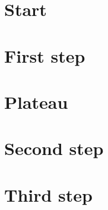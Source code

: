 \documentclass[10pt,a4paper]{article}
\begin{document}
\section{Start}\lipsum[1-7]
\section{First step}\limenthreshold\lipsum[8-16]
\section{Plateau}\lipsum[17-22]
\section{Second step}\limenthreshold\lipsum[23-31]
\section{Third step}\limenthreshold\lipsum[32-40]
\end{document}
